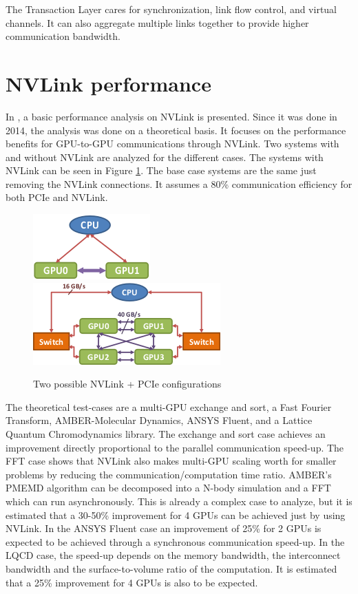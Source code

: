 The Transaction Layer cares for synchronization, link flow control, and virtual channels.
It can also aggregate multiple links together to provide higher communication bandwidth.

\section{NVLink performance}
In \cite{nvidia:nvlinkperformance}, a basic performance analysis on NVLink is presented.
Since it was done in 2014, the analysis was done on a theoretical basis.
It focuses on the performance benefits for GPU-to-GPU communications through NVLink.
Two systems with and without NVLink are analyzed for the different cases.
The systems with NVLink can be seen in Figure \ref{fig:nvlinkconfigs}.
The base case systems are the same just removing the NVLink connections.
It assumes a 80\% communication efficiency for both PCIe and NVLink.

\begin{figure}[ht!]
    \centering
    \includegraphics[width=0.45\linewidth]{2gpus}\\
    \vspace*{0.5cm}
    \includegraphics[width=0.8\linewidth]{4gpus}
    \caption{Two possible NVLink + PCIe configurations}
    \label{fig:nvlinkconfigs}
\end{figure}

The theoretical test-cases are a multi-GPU exchange and sort, a Fast Fourier Transform, AMBER-Molecular Dynamics, ANSYS Fluent, and a Lattice Quantum Chromodynamics library.
The exchange and sort case achieves an improvement directly proportional to the parallel communication speed-up.
The FFT case shows that NVLink also makes multi-GPU scaling worth for smaller problems by reducing the communication/computation time ratio.
AMBER's PMEMD algorithm can be decomposed into a N-body simulation and a FFT which can run asynchronously.
This is already a complex case to analyze, but it is estimated that a 30-50\% improvement for 4 GPUs can be achieved just by using NVLink.
In the ANSYS Fluent case an improvement of 25\% for 2 GPUs is expected to be achieved through a synchronous communication speed-up.
In the LQCD case, the speed-up depends on the memory bandwidth, the interconnect bandwidth and the surface-to-volume ratio of the computation.
It is estimated that a 25\% improvement for 4 GPUs is also to be expected.
